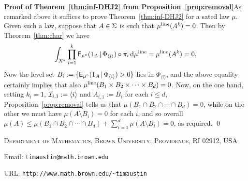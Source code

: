 \documentclass[11pt]{article}
\begin{document}
\textbf{Proof of Theorem~\ref{thm:inf-DHJ2} from
Proposition~\ref{prop:removal}}\quad As remarked above it suffices
to prove Theorem~\ref{thm:inf-DHJ2} for a sated law $\mu$. Given
such a law, suppose that $A \in \S$ is such that $\mu^\line(A^k) =
0$. Then by Theorem~\ref{thm:char} we have
\[\int_{X^k}\prod_{i=1}^k \sfE_{\mu^\circ}(1_A\,|\,\Phi_{\langle i\rangle})\circ\pi_i\,\d\mu^\line = \mu^\line(A^k) = 0.\]
Now the level set $B_i := \{\sfE_{\mu^\circ}(1_A\,|\,\Phi_{\langle
i\rangle})
> 0\}$ lies in $\Phi_{\langle i\rangle}$, and the above equality certainly
implies that also $\mu^\line(B_1\times B_2\times \cdots\times B_d) =
0$.  Now, on the one hand, setting $k_i=1$, $\I_{i,1}:= \langle
i\rangle$ and $A_{i,1} := B_i$ for each $i \leq d$,
Proposition~\ref{prop:removal} tells us that $\mu(B_1\cap
B_2\cap\cdots\cap B_d) = 0$, while on the other we must have
$\mu(A\setminus B_i) = 0$ for each $i$, and so overall $\mu(A) \leq
\mu(B_1\cap B_2\cap\cdots\cap B_d) + \sum_{i=1}^d\mu(A\setminus B_i)
= 0$, as required. \qed

\parskip 0pt




\vspace{10pt}

\small{\textsc{Department of Mathematics, Brown University,
Providence, RI 02912, USA}}

\vspace{5pt}

\small{Email: \verb|timaustin@math.brown.edu|}

\vspace{5pt}

\small{URL: \verb|http://www.math.brown.edu/~timaustin|}
\end{document}

